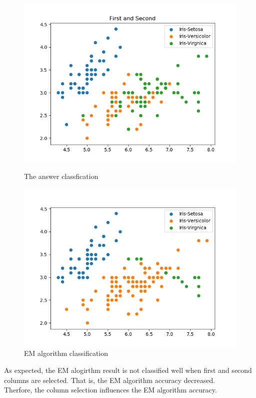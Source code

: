 \documentclass[a4paper]{article}
\begin{document}
	\clearpage
	\begin{figure}[h!]
		\centering
		\begin{minipage}[t]{6.5cm}
			\includegraphics[width=1.0\textwidth]{12.png}
			\caption{The answer classfication}
		\end{minipage}
		\hspace{2cm}
		\begin{minipage}[t]{6.5cm}
			\includegraphics[width=1.0\textwidth]{12_p.png}
			\caption{EM algorithm classification}
		\end{minipage}
	\end{figure}

	As expected, the EM alogirthm result is not classified well when first and second columns are selected. That is, the EM algorithm accuracy decreased.\\
	Therfore, the column selection influences the EM algorithm accuracy.
\end{document}
